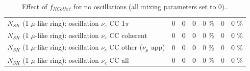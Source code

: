 \begin{table}
\begin{tabular}{| l | r | r | r  r | r  r |}
                     $N_{SK}$ (1 $\mu$-like ring): oscillation $\nu_e$ CC 1$\pi$ &               0 &               0 &               0 &        0 \%  &               0 &        0 \%  \\ 
                   $N_{SK}$ (1 $\mu$-like ring): oscillation $\nu_e$ CC coherent &               0 &               0 &               0 &        0 \%  &               0 &        0 \%  \\ 
      $N_{SK}$ (1 $\mu$-like ring): oscillation $\nu_e$ CC other ($\nu_\mu$ app) &               0 &               0 &               0 &        0 \%  &               0 &        0 \%  \\ 
                       $N_{SK}$ (1 $\mu$-like ring): oscillation $\nu_e$  CC all &               0 &               0 &               0 &        0 \%  &               0 &        0 \%  \\ 
\hline
\hline
\end{tabular}
\caption{ Effect of $f_{NCoth; t}$ for no oscillations (all mixing parameters set to 0).. }
\label{tab:num_xsec_norm_ncoth_1RmuT_3f_osc_t13:0}
\end{table}
\clearpage
